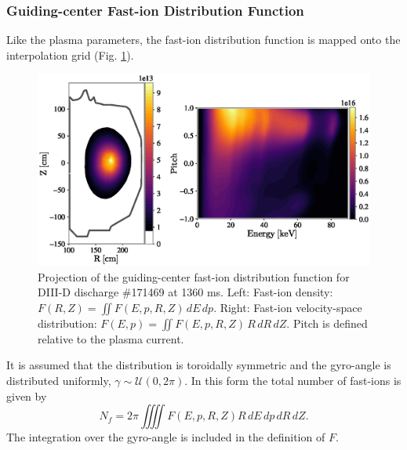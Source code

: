 \subsubsection{Guiding-center Fast-ion Distribution Function}
Like the plasma parameters, the fast-ion distribution function is mapped onto the interpolation grid (Fig. \ref{fig:fast_ion_distribution}). 
\begin{figure}
    \centering
    \includegraphics[width=13cm]{figures/fast_ion_distribution.eps}
    \caption{Projection of the guiding-center fast-ion distribution function for DIII-D discharge \#171469 at 1360 ms. Left: Fast-ion density: $F(R,Z)=\iint F(E,p,R,Z)\,dE\,dp$. Right: Fast-ion velocity-space distribution: $F(E,p)=\iint F(E,p,R,Z)\,R\,dR\,dZ$. Pitch is defined relative to the plasma current.}
    \label{fig:fast_ion_distribution}
\end{figure}
It is assumed that the distribution is toroidally symmetric and the gyro-angle is distributed uniformly, $\gamma \sim \mathcal{U}(0,2\pi)$.
In this form the total number of fast-ions is given by
\begin{equation}\label{eq:f_ntot}
    N_{f} = 2\pi \iiiint F(E,p,R,Z) R\,dE\,dp\,dR\,dZ.
\end{equation}
The integration over the gyro-angle is included in the definition of $F$.

